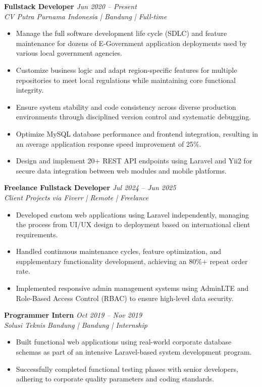 \documentclass[11pt,a4paper]{article}
\begin{document}
\textbf{Fullstack Developer} \hfill \textit{Jun 2020 -- Present} \\
\textit{CV Putra Purnama Indonesia | Bandung | Full-time}
\begin{itemize}
    \item Manage the full software development life cycle (SDLC) and feature maintenance for dozens of E-Government application deployments used by various local government agencies.
    \item Customize business logic and adapt region-specific features for multiple repositories to meet local regulations while maintaining core functional integrity.
    \item Ensure system stability and code consistency across diverse production environments through disciplined version control and systematic debugging.
    \item Optimize MySQL database performance and frontend integration, resulting in an average application response speed improvement of 25\%.
    \item Design and implement 20+ REST API endpoints using Laravel and Yii2 for secure data integration between web modules and mobile platforms.
\end{itemize}

\textbf{Freelance Fullstack Developer} \hfill \textit{Jul 2024 -- Jun 2025} \\
\textit{Client Projects via Fiverr | Remote | Freelance}
\begin{itemize}
    \item Developed custom web applications using Laravel independently, managing the process from UI/UX design to deployment based on international client requirements.
    \item Handled continuous maintenance cycles, feature optimization, and supplementary functionality development, achieving an 80\%+ repeat order rate.
    \item Implemented responsive admin management systems using AdminLTE and Role-Based Access Control (RBAC) to ensure high-level data security.
\end{itemize}

\textbf{Programmer Intern} \hfill \textit{Oct 2019 -- Nov 2019} \\
\textit{Solusi Teknis Bandung | Bandung | Internship}
\begin{itemize}
    \item Built functional web applications using real-world corporate database schemas as part of an intensive Laravel-based system development program.
    \item Successfully completed functional testing phases with senior developers, adhering to corporate quality parameters and coding standards.
\end{itemize}
\end{document}
